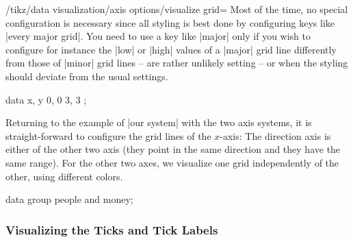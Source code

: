 \begin{key}{/tikz/data visualization/axis options/visualize grid=}
    Most of the time, no special configuration is necessary since all styling
    is best done by configuring keys like |every major grid|. You need to use a
    key like |major| only if you wish to configure for instance the |low| or
    |high| values of a |major| grid line differently from those of |minor| grid
    lines -- are rather unlikely setting -- or when the styling should deviate
    from the usual settings.
\begin{codeexample}[preamble={\usetikzlibrary{datavisualization}}]
\tikz \datavisualization [
    xy Cartesian,
    all axes={visualize axis={low=0, style=->},
              grid={some, minor steps between steps}},
    x axis=  {visualize grid={
                direction axis=y axis,
                minor={low=0.25, high=1.75, style=red!50}}},
    visualize as scatter]
  data {
    x, y
    0, 0
    3, 3
  };
\end{codeexample}
\end{key}

Returning to the example of |our system| with the two axis systems, it is
straight-forward to configure the grid lines of the $x$-axis: The direction
axis is either of the other two axis (they point in the same direction and they
have the same range). For the other two axes, we visualize one grid
independently of the other, using different colors.
%
\begin{codeexample}[preamble={\usetikzlibrary{datavisualization}}]
%
\tikz \datavisualization [
    our system,
    x axis={attribute=time, length=3cm, grid=many},
    left axis ={attribute=money, grid=some},
    right axis={attribute=people, grid=few},
    visualize as line/.list={people 1, people 2, money 1, money 2}]
  data group {people and money};
\end{codeexample}


\subsubsection{Visualizing the Ticks and Tick Labels}
\label{section-dv-visualize-ticks}

